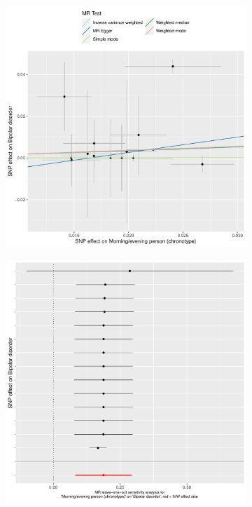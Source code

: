 \documentclass[journal,article,submit,moreauthors,pdftex]{Definitions/mdpi}
\begin{document}
\begin{figure}[htbp]
\begin{subfigure}{.5\linewidth}
\centering
	\includegraphics[width=\linewidth]{Figs/Analysis2/Morning_evening_person_(chronotype)_vs_Bipolar_disorder.Scatterplots.pdf}
\caption{}
\label{bipolarScatter}
\end{subfigure}
\begin{subfigure}{.5\linewidth}
\centering
	\includegraphics[width=\linewidth,keepaspectratio]{Figs/Analysis2/Morning_evening_person_(chronotype)_vs_Bipolar_disorder.LOOplots.pdf}

\end{subfigure}
\end{figure}
\end{document}
